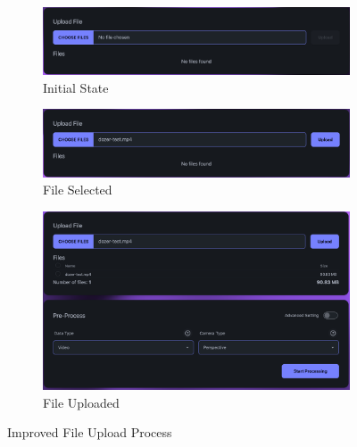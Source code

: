 \begin{figure}[htb]
  \begin{subfigure}{\textwidth}
    \centering
    \includegraphics[width=.7\linewidth]{figures/fix-4.1.png}
    \caption{Initial State}
  \end{subfigure}
  \begin{subfigure}{\textwidth}
    \centering
    \includegraphics[width=.7\linewidth]{figures/fix-4.2.png}
    \caption{File Selected}
  \end{subfigure}
  \begin{subfigure}{\textwidth}
    \centering
    \includegraphics[width=.7\linewidth]{figures/fix-4.3.png}
    \caption{File Uploaded}
  \end{subfigure}
	\caption{Improved File Upload Process}
  \label{fig:fix-4}
\end{figure}
